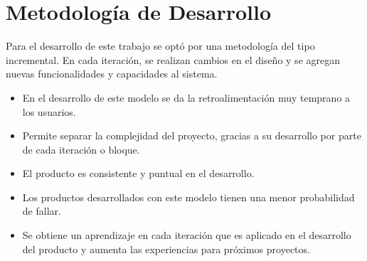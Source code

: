 \chapter{Metodología de Desarrollo}
\label{chap:metodologia}
Para el desarrollo de este trabajo se opt\'o por una metodolog\'ia del tipo incremental.
En cada iteraci\'on, se realizan cambios en el dise\~no y se agregan nuevas funcionalidades y capacidades al sistema.
\begin{itemize}
\item En el desarrollo de este modelo se da la retroalimentaci\'on muy temprano a los usuarios.
\item Permite separar la complejidad del proyecto, gracias a su desarrollo por parte de cada iteraci\'on o bloque.
\item El producto es consistente y puntual en el desarrollo.
\item Los productos desarrollados con este modelo tienen una menor probabilidad de fallar.
\item Se obtiene un aprendizaje en cada iteraci\'on que es aplicado en el desarrollo del producto y aumenta las experiencias para pr\'oximos proyectos.
\end{itemize}



